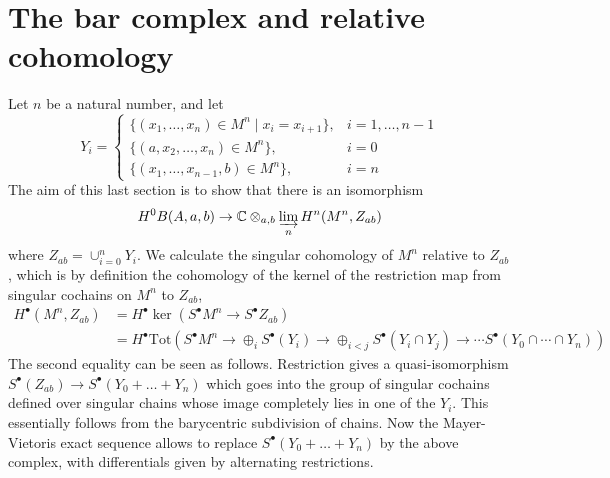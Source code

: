 \section{The bar complex and relative cohomology}
Let $n$ be a natural number, and let
\[
Y_i = \left\{ \begin{array}{ll}
\{ (x_1, \ldots, x_n) \in M^n \mid x_i = x_{i+1} \}, & i = 1, \ldots, n-1 \\
\{ (a, x_2, \ldots, x_n) \in M^n \}, & i =0 \\
\{ (x_1, \ldots, x_{n-1}, b) \in M^n \}, & i = n
\end{array} \right.
\]
The aim of this last section is to show that there is an isomorphism 
\[
H^0 B(A, a, b) \to \mathbb{C} \otimes_{a, b} \varinjlim_n H^n(M^n, Z_{ab})
\]
where $Z_{ab} = \cup_{i=0}^n Y_i$. 
We calculate the singular cohomology of $M^n$ relative to $Z_{ab}$, which is by definition the cohomology of the kernel of the restriction map from singular cochains on $M^n$ to $Z_{ab}$,
\begin{align*}
H^\bullet(M^n, Z_{ab}) & = H^\bullet \ker(S^\bullet M^n \to S^\bullet Z_{ab}) \\
& = H^\bullet \textrm{Tot}(S^\bullet M^n \to \oplus_i S^\bullet(Y_i) \to \oplus_{i < j} S^\bullet(Y_i \cap Y_j) \to \cdots S^\bullet(Y_0 \cap \cdots \cap Y_n)) 
\end{align*}
The second equality can be seen as follows. 
Restriction gives a quasi-isomorphism $S^{\bullet}(Z_{ab}) \to S^{\bullet}(Y_0 + \ldots + Y_n)$ which goes into the group of singular cochains defined over singular chains whose image completely lies in one of the $Y_i$. This essentially follows from the barycentric subdivision of chains. 
Now the Mayer-Vietoris exact sequence allows to replace $S^\bullet(Y_0 + \ldots + Y_n)$ by the above complex, with differentials given by alternating restrictions.  

